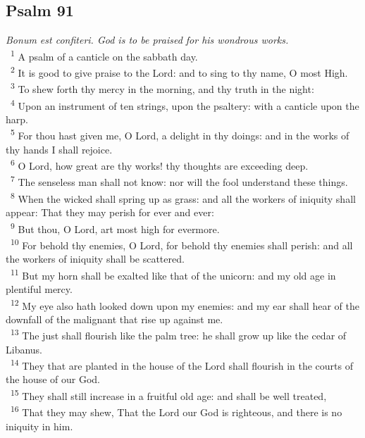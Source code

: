 \documentclass[a5paper,12pt]{article}
\begin{document}
\begin{multicols*}{2}
\section{Psalm 91}
\label{sec:orgb948088}
\emph{Bonum est confiteri. God is to be praised for his wondrous works.}\\

~\textsuperscript{1} A psalm of a canticle on the sabbath day.\\
~\textsuperscript{2} It is good to give praise to the Lord: and to sing to thy name, O most High.\\
~\textsuperscript{3} To shew forth thy mercy in the morning, and thy truth in the night:\\
~\textsuperscript{4} Upon an instrument of ten strings, upon the psaltery: with a canticle upon the harp.\\
~\textsuperscript{5} For thou hast given me, O Lord, a delight in thy doings: and in the works of thy hands I shall rejoice.\\
~\textsuperscript{6} O Lord, how great are thy works! thy thoughts are exceeding deep.\\
~\textsuperscript{7} The senseless man shall not know: nor will the fool understand these things.\\
~\textsuperscript{8} When the wicked shall spring up as grass: and all the workers of iniquity shall appear: That they may perish for ever and ever:\\
~\textsuperscript{9} But thou, O Lord, art most high for evermore.\\
~\textsuperscript{10} For behold thy enemies, O Lord, for behold thy enemies shall perish: and all the workers of iniquity shall be scattered.\\
~\textsuperscript{11} But my horn shall be exalted like that of the unicorn: and my old age in plentiful mercy.\\
~\textsuperscript{12} My eye also hath looked down upon my enemies: and my ear shall hear of the downfall of the malignant that rise up against me.\\
~\textsuperscript{13} The just shall flourish like the palm tree: he shall grow up like the cedar of Libanus.\\
~\textsuperscript{14} They that are planted in the house of the Lord shall flourish in the courts of the house of our God.\\
~\textsuperscript{15} They shall still increase in a fruitful old age: and shall be well treated,\\
~\textsuperscript{16} That they may shew, That the Lord our God is righteous, and there is no iniquity in him.\\


\end{multicols*}
\end{document}
